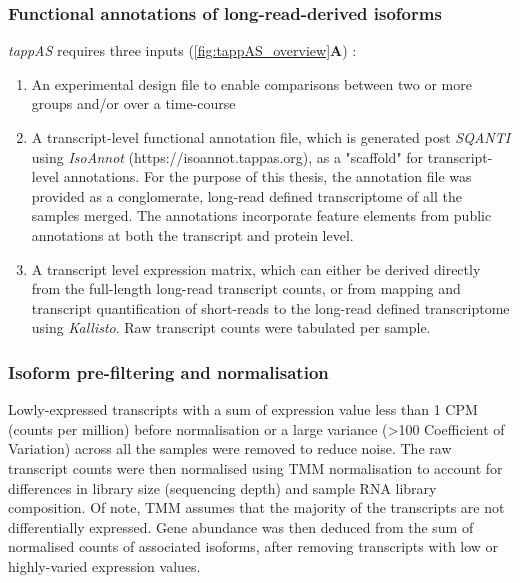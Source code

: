 \clearpage
\subsubsection{Functional annotations of long-read-derived isoforms}
\textit{tappAS} requires three inputs (\cref{fig:tappAS_overview}\textbf{A}) :
\begin{enumerate}
	\item An experimental design file to enable comparisons between two or more groups and/or over a time-course 
	\item A transcript-level functional annotation file, which is generated post \textit{SQANTI} using \textit{IsoAnnot} (https://isoannot.tappas.org), as a "scaffold" for transcript-level annotations. For the purpose of this thesis, the annotation file was provided as a conglomerate, long-read defined transcriptome of all the samples merged. The annotations incorporate feature elements from public annotations at both the transcript and protein level. 
	\item A transcript level expression matrix, which can either be derived directly from the full-length long-read transcript counts, or from mapping and transcript quantification of short-reads to the long-read defined transcriptome using \textit{Kallisto}\cite{Bray2016}. Raw transcript counts were tabulated per sample.  	 
\end{enumerate}


\subsubsection{Isoform pre-filtering and normalisation}
Lowly-expressed transcripts with a sum of expression value less than 1 CPM (counts per million) before normalisation or a large variance (>100 Coefficient of Variation) across all the samples were removed to reduce noise. The raw transcript counts were then normalised using TMM normalisation \cite{Robinson2010} to account for differences in library size (sequencing depth) and sample RNA library composition. Of note, TMM assumes that the majority of the transcripts are not differentially expressed. Gene abundance was then deduced from the sum of normalised counts of associated isoforms, after removing transcripts with low or highly-varied expression values. 
 

